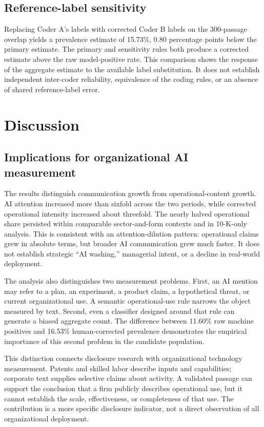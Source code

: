 \documentclass[12pt]{article}
\begin{document}
\subsection{Reference-label sensitivity}

Replacing Coder A's labels with corrected Coder B labels on the 300-passage
overlap yields a prevalence estimate of 15.73\%, 0.80 percentage points below
the primary estimate. The primary and sensitivity rules both produce a
corrected estimate above the raw model-positive rate. This comparison shows
the response of the aggregate estimate to the available label substitution.
It does not establish independent inter-coder reliability, equivalence of the
coding rules, or an absence of shared reference-label error.

\section{Discussion}

\subsection{Implications for organizational AI measurement}

The results distinguish communication growth from operational-content growth.
AI attention increased more than sixfold across the two periods, while
corrected operational intensity increased about threefold. The nearly halved
operational share persisted within comparable sector-and-form contexts and in
10-K-only analysis. This is consistent with an attention-dilution pattern:
operational claims grew in absolute terms, but broader AI communication grew
much faster. It does not establish strategic ``AI washing,'' managerial
intent, or a decline in real-world deployment.

The analysis also distinguishes two measurement problems. First, an AI mention may
refer to a plan, an experiment, a product claim, a hypothetical threat, or
current organizational use. A semantic operational-use rule narrows the
object measured by text. Second, even a classifier designed around that rule
can generate a biased aggregate count. The difference between 11.60\% raw
machine positives and 16.53\% human-corrected prevalence demonstrates the
empirical importance of this second problem in the candidate population.

This distinction connects disclosure research with organizational technology
measurement. Patents and skilled labor describe inputs and capabilities;
corporate text supplies selective claims about activity. A validated passage
can support the conclusion that a firm publicly describes operational use,
but it cannot establish the scale, effectiveness, or completeness of that
use. The contribution is a more specific disclosure indicator, not a direct
observation of all organizational deployment.
\end{document}
